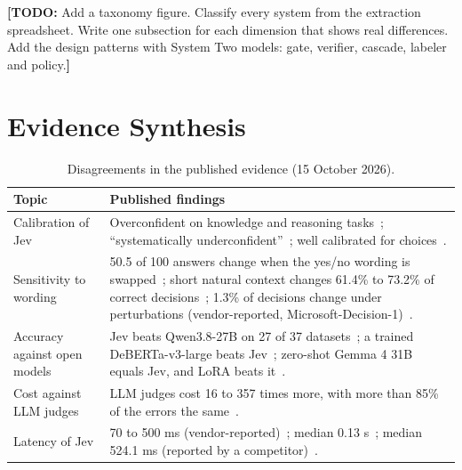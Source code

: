 \documentclass[acmsmall,nonacm,screen]{acmart}
\newcommand{\todo}[1]{{\color{red}\textbf{[TODO: }#1\textbf{]}}}
\newcommand{\stwos}{System Two models\xspace}
\begin{document}
\todo{Add a taxonomy figure. Classify every system from the extraction spreadsheet. Write one subsection for each dimension that shows real differences. Add the design patterns with \stwos: gate, verifier, cascade, labeler and policy.}

\section{Evidence Synthesis}
\label{sec:evidence}

\begin{table}[t]
  \caption{Disagreements in the published evidence (15 October 2026).}
  \label{tab:conflicts}
  \small
  \begin{tabularx}{\linewidth}{@{}lX@{}}
    \toprule
    Topic & Published findings \\
    \midrule
    Calibration of Jev & Overconfident on knowledge and reasoning tasks~\cite{artificialanalysis2026decision}; ``systematically underconfident''~\cite{sharma2026typedbench}; well calibrated for choices~\cite{deusser2026evaluating}. \\
    Sensitivity to wording & 50.5 of 100 answers change when the yes/no wording is swapped~\cite{rafe2026benchmarking}; short natural context changes 61.4\% to 73.2\% of correct decisions~\cite{xu2026jevout}; 1.3\% of decisions change under perturbations (vendor-reported, Microsoft-Decision-1)~\cite{microsoft2026decision1}. \\
    Accuracy against open models & Jev beats Qwen3.8-27B on 27 of 37 datasets~\cite{deusser2026evaluating}; a trained DeBERTa-v3-large beats Jev~\cite{rafe2026benchmarking}; zero-shot Gemma 4 31B equals Jev, and LoRA beats it~\cite{geuter2026releasing}. \\
    Cost against LLM judges & LLM judges cost 16 to 357 times more, with more than 85\% of the errors the same~\cite{rao2026decision}. \\
    Latency of Jev & 70 to 500 ms (vendor-reported)~\cite{typesafe2026introducing}; median 0.13 s~\cite{artificialanalysis2026decision}; median 524.1 ms (reported by a competitor)~\cite{cloudflare2026clef}. \\
    \bottomrule
  \end{tabularx}
\end{table}
\end{document}

